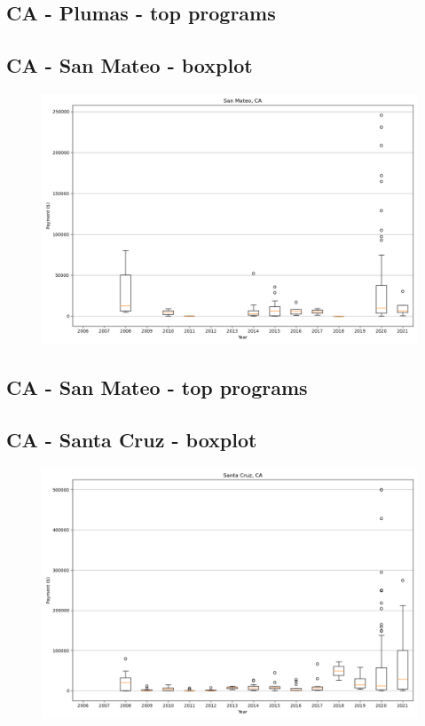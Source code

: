 \subsection*{CA - Plumas - top programs}

\newpage
\subsection*{CA - San Mateo - boxplot}
\begin{figure}[h]
\centering
\includegraphics[width=7in]{../output/boxplots/counties/San Mateo-CA_boxplot.png}
\end{figure}


\subsection*{CA - San Mateo - top programs}

\newpage
\subsection*{CA - Santa Cruz - boxplot}
\begin{figure}[h]
\centering
\includegraphics[width=7in]{../output/boxplots/counties/Santa Cruz-CA_boxplot.png}
\end{figure}


